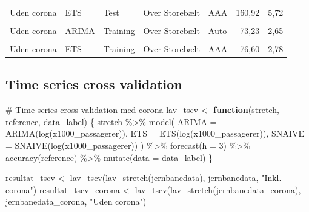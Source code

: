 \documentclass[
  danish,
]{article}
\newenvironment{Shaded}{\begin{snugshade}}{\end{snugshade}}
\newcommand{\AttributeTok}[1]{\textcolor[rgb]{0.40,0.45,0.13}{#1}}
\newcommand{\CommentTok}[1]{\textcolor[rgb]{0.37,0.37,0.37}{#1}}
\newcommand{\ControlFlowTok}[1]{\textcolor[rgb]{0.00,0.23,0.31}{\textbf{#1}}}
\newcommand{\DecValTok}[1]{\textcolor[rgb]{0.68,0.00,0.00}{#1}}
\newcommand{\FunctionTok}[1]{\textcolor[rgb]{0.28,0.35,0.67}{#1}}
\newcommand{\NormalTok}[1]{\textcolor[rgb]{0.00,0.23,0.31}{#1}}
\newcommand{\OtherTok}[1]{\textcolor[rgb]{0.00,0.23,0.31}{#1}}
\newcommand{\SpecialCharTok}[1]{\textcolor[rgb]{0.37,0.37,0.37}{#1}}
\newcommand{\StringTok}[1]{\textcolor[rgb]{0.13,0.47,0.30}{#1}}
\begin{document}
\begin{table}
{\begin{tabular}[t]{lllllrr}
Uden corona & ETS & Test & Over Storebælt & AAA & 160,92 & 5,72\\
\cellcolor{gray!10}{Uden corona} & \cellcolor{gray!10}{ARIMA} & \cellcolor{gray!10}{Training} & \cellcolor{gray!10}{International trafik i alt} & \cellcolor{gray!10}{M4} & \cellcolor{gray!10}{175,12} & \cellcolor{gray!10}{3,60}\\
Uden corona & ARIMA & Training & Over Storebælt & Auto & 73,23 & 2,65\\
\cellcolor{gray!10}{Uden corona} & \cellcolor{gray!10}{ETS} & \cellcolor{gray!10}{Training} & \cellcolor{gray!10}{International trafik i alt} & \cellcolor{gray!10}{Auto} & \cellcolor{gray!10}{178,14} & \cellcolor{gray!10}{3,51}\\
\addlinespace
Uden corona & ETS & Training & Over Storebælt & AAA & 76,60 & 2,78\\
\bottomrule
\end{tabular}

}

\end{table}%

\subsection{Time series cross
validation}\label{time-series-cross-validation}

\begin{Shaded}
\begin{Highlighting}[]
\CommentTok{\# Time series cross validation med corona}
\NormalTok{lav\_tscv }\OtherTok{\textless{}{-}} \ControlFlowTok{function}\NormalTok{(stretch, reference, data\_label) \{}
\NormalTok{  stretch }\SpecialCharTok{\%\textgreater{}\%}
    \FunctionTok{model}\NormalTok{(}
      \AttributeTok{ARIMA  =} \FunctionTok{ARIMA}\NormalTok{(}\FunctionTok{log}\NormalTok{(x1000\_passagerer)),}
      \AttributeTok{ETS    =} \FunctionTok{ETS}\NormalTok{(}\FunctionTok{log}\NormalTok{(x1000\_passagerer)),}
      \AttributeTok{SNAIVE =} \FunctionTok{SNAIVE}\NormalTok{(}\FunctionTok{log}\NormalTok{(x1000\_passagerer))}
\NormalTok{    ) }\SpecialCharTok{\%\textgreater{}\%}
    \FunctionTok{forecast}\NormalTok{(}\AttributeTok{h =} \DecValTok{3}\NormalTok{) }\SpecialCharTok{\%\textgreater{}\%}
    \FunctionTok{accuracy}\NormalTok{(reference) }\SpecialCharTok{\%\textgreater{}\%}
    \FunctionTok{mutate}\NormalTok{(}\AttributeTok{data =}\NormalTok{ data\_label)}
\NormalTok{\}}

\NormalTok{resultat\_tscv        }\OtherTok{\textless{}{-}} \FunctionTok{lav\_tscv}\NormalTok{(}\FunctionTok{lav\_stretch}\NormalTok{(jernbanedata),}
\NormalTok{                                 jernbanedata,}
                                 \StringTok{"Inkl. corona"}\NormalTok{)}
\NormalTok{resultat\_tscv\_corona }\OtherTok{\textless{}{-}} \FunctionTok{lav\_tscv}\NormalTok{(}\FunctionTok{lav\_stretch}\NormalTok{(jernbanedata\_corona), }
\NormalTok{                                 jernbanedata\_corona, }
                                 \StringTok{"Uden corona"}\NormalTok{)}
\end{Highlighting}
\end{Shaded}
\end{document}
